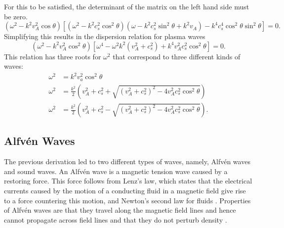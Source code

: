 \documentclass[a4paper]{article}
\begin{document}
For this to be satisfied, the determinant of the matrix on the left hand side must be zero. 
\[
	(\omega^2 - k^2v_A^2 \cos \theta)\left[ (\omega^2-k^2c_s^2 \cos^2 \theta)(\omega - k^2c_s^2 \sin^2 \theta + k^2 v_A) - k^4c_s^{4}\cos^2\theta \sin^2\theta   \right] = 0
.\] 
Simplifying this results in the dispersion relation for plasma waves
\begin{equation}\label{eq:disperion}
	(\omega^2 - k^2 v_A^2 \cos^2 \theta)\left[ \omega^{4} - \omega^2k^2(v_A^2 + c_s^2) + k^{4}v_A^2c_s^2\cos^2\theta \right]  = 0
.\end{equation} 
This relation has three roots for $\omega^2$ that correspond to three different kinds of waves:
\begin{align*}
	\omega^2 &=  k^2v_a^2\cos^2\theta \tag{Alv\'en Waves} \\
	\omega^2 &= \frac{k^2}{2}\left( v_A^2 + c_s^2 + \sqrt{(v_A^2 + c_s^2)^2 - 4v_A^2c_s^2\cos^2\theta}  \right) \tag{Fast magnetosonic waves}\\
	\omega^2 &= \frac{k^2}{2}\left( v_A^2 + c_s^2 - \sqrt{(v_A^2 + c_s^2)^2 - 4v_A^2c_s^2\cos^2\theta}  \right) \tag{Slow magnetosonic waves}
.\end{align*}
\subsection{Alfv\'en Waves}
The previous derivation led to two different types of waves, namely, Alfv\'en waves and sound waves. An Alfv\'en wave is a magnetic tension wave caused by a restoring force. 
This force follows from Lenz's law, which states that the electrical currents caused by the motion of a conducting fluid in a magnetic field give rise to a force countering this motion, and Newton's second law for fluids \cite{Finlay2007}. 
Properties of Alfv\'en waves are that they travel along the magnetic field lines and hence cannot propagate across field lines and that they do not perturb density \cite{mhdppt}.\\
\end{document}
